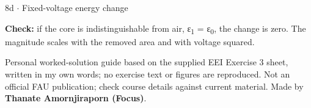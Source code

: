 \documentclass[11pt]{article}
\begin{document}
\begin{keepsection}
\begin{workedbox}{8d \ensuremath{\cdot} Fixed-voltage energy change}
\begin{enumerate}
\textbf{Check:} if the core is indistinguishable from air, ε\textsubscript{1} = ε\textsubscript{0}, the change is zero. The magnitude scales with the removed area and with voltage squared.
\end{enumerate}
\end{workedbox}

\end{keepsection}

\vfill{\small Personal worked-solution guide based on the supplied EEI Exercise 3 sheet, written in my own words; no exercise text or figures are reproduced. Not an official FAU publication; check course details against current material. Made by \textbf{Thanate Amornjiraporn (Focus)}.}
\end{document}

